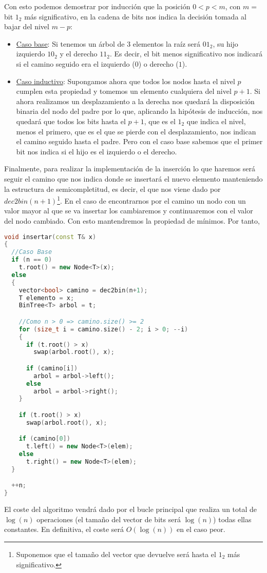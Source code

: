 \documentclass[10pt,a4paper,openright]{book}
\theoremstyle{break}
\begin{document}
Con esto podemos demostrar por inducción que la posición $0 < p < m$, con $m = $ bit $1_2$ más significativo, en la cadena de bits nos indica la decisión tomada al bajar del nivel $m - p$:
\begin{itemize}
    \item \underline{Caso base}: Si tenemos un árbol de $3$ elementos la raíz será $01_2$, su hijo izquierdo $10_2$ y el derecho $11_2$. Es decir, el bit menos significativo nos indicará si el camino seguido era el izquierdo ($0$) o derecho ($1$).
    \item \underline{Caso inductivo}: Supongamos ahora que todos los nodos hasta el nivel $p$ cumplen esta propiedad y tomemos un elemento cualquiera del nivel $p + 1$. Si ahora realizamos un desplazamiento a la derecha nos quedará la disposición binaria del nodo del padre por lo que, aplicando la hipótesis de inducción, nos quedará que todos los bits hasta el $p + 1$, que es el $1_2$ que indica el nivel, menos el primero, que es el que se pierde con el desplazamiento, nos indican el camino seguido hasta el padre. Pero
        con el caso base sabemos que el primer bit nos indica si el hijo es el izquierdo o el derecho.
\end{itemize}

Finalmente, para realizar la implementación de la inserción lo que haremos será seguir el camino que nos indica donde se insertará el nuevo elemento manteniendo la estructura de semicompletitud, es decir, el que nos viene dado por $dec2bin(n+1)$\footnote{Suponemos que el tamaño del vector que devuelve será hasta el $1_2$ más significativo.}. 
En el caso de encontrarnos por el camino un nodo con un valor mayor al que se va insertar los cambiaremos y continuaremos con el valor del nodo cambiado. Con esto mantendremos la propiedad de mínimos. Por tanto,

\begin{minipage}{\linewidth}
\begin{lstlisting}[language=c++]
void insertar(const T& x)
{
  //Caso Base
  if (n == 0) 
    t.root() = new Node<T>(x); 
  else 
  {
    vector<bool> camino = dec2bin(n+1); 
    T elemento = x;
    BinTree<T> arbol = t;

    //Como n > 0 => camino.size() >= 2
    for (size_t i = camino.size() - 2; i > 0; --i)
    { 
      if (t.root() > x) 
        swap(arbol.root(), x);

      if (camino[i])
        arbol = arbol->left();
      else 
        arbol = arbol->right();
    }

    if (t.root() > x) 
      swap(arbol.root(), x);

    if (camino[0])
      t.left() = new Node<T>(elem);
    else 
      t.right() = new Node<T>(elem);
  }

  ++n;
}
\end{lstlisting}    
\end{minipage}

El coste del algoritmo vendrá dado por el bucle principal que realiza un total de $\log\left( n \right)$ operaciones (el tamaño del vector de bits será $\log\left( n \right)$) todas ellas constantes. En definitiva, el coste será $O\left( \log\left( n \right) \right)$ en el caso peor.
\end{document}
